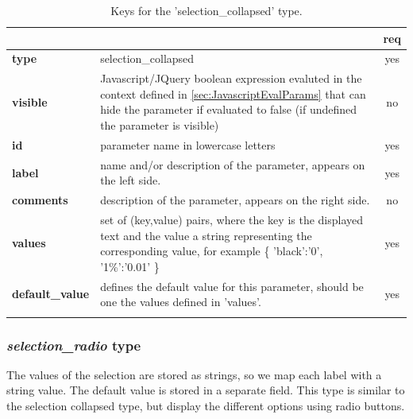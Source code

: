 \begin{longtable}{|>{\bf}L{\linewidth}|L{\linewidth}|c|}
\hline
      &  & {\bf req} 
\tabularnewline \hline \hline
 type  & selection\_collapsed    & yes \\ \hline
 visible  & Javascript/JQuery boolean expression evaluted in the context defined 
              in \ref{sec:JavascriptEvalParams} that can hide the parameter if
            evaluated to false (if undefined the parameter is visible)& no \\ \hline
 id     & parameter name in lowercase letters & yes \\ \hline
 label  & name and/or description of the parameter, appears on the left side. & yes
                      \\ \hline
 comments & description of the parameter, appears on the right side. & no
                      \\ \hline
 values & set of (key,value) pairs, where the key is the displayed text and the 
value a string representing the corresponding value, for example \{ 
'black':'0', '1\%':'0.01' \} & yes
                      \\ \hline
 default\_value & defines the default value for this parameter, should be one 
the values defined in 'values'. & yes \\ \hline
\caption{Keys for the 'selection\_collapsed' type.}
\end{longtable}

\subsubsection{ \emph{selection\_radio} type}

The values of the selection are stored as strings, so we map each label with a 
string value. The default value is stored in a separate field.
This type is similar to the selection collapsed type, but display the different
options using radio buttons.

